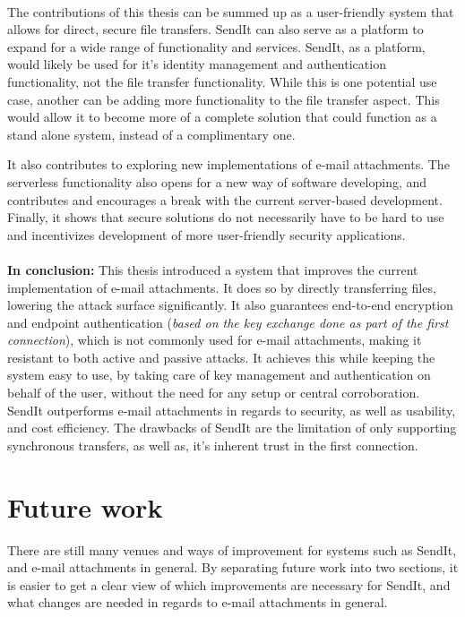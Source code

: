 \paragraph{}
%
The contributions of this thesis can be summed up as a user-friendly system that allows for direct, secure file transfers. SendIt can also serve as a platform to expand for a wide range of functionality and services. SendIt, as a platform, would likely be used for it's identity management and authentication functionality, not the file transfer functionality. While this is one potential use case, another can be adding more functionality to the file transfer aspect. This would allow it to become more of a complete solution that could function as a stand alone system, instead of a complimentary one.

It also contributes to exploring new implementations of e-mail attachments. The serverless functionality also opens for a new way of software developing, and contributes and encourages a break with the current server-based development. Finally, it shows that secure solutions do not necessarily have to be hard to use and incentivizes development of more user-friendly security applications.
%
\paragraph{}
%
\textbf{In conclusion:} This thesis introduced a system that improves the current implementation of e-mail attachments. It does so by directly transferring files, lowering the attack surface significantly. It also guarantees end-to-end encryption and endpoint authentication (\emph{based on the key exchange done as part of the first connection}), which is not commonly used for e-mail attachments, making it resistant to both active and passive attacks. It achieves this while keeping the system easy to use, by taking care of key management and authentication on behalf of the user, without the need for any setup or central corroboration. SendIt outperforms e-mail attachments in regards to security, as well as usability, and cost efficiency. The drawbacks of SendIt are the limitation of only supporting synchronous transfers, as well as, it's inherent trust in the first connection.
%
\section{Future work}
%
There are still many venues and ways of improvement for systems such as SendIt, and e-mail attachments in general. By separating future work into two sections, it is easier to get a clear view of which improvements are necessary for SendIt, and what changes are needed in regards to e-mail attachments in general.

